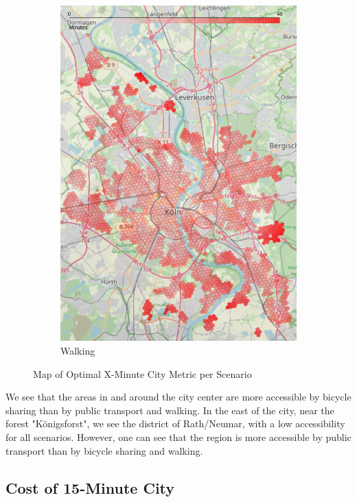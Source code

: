 \begin{figure}
\begin{subfigure}[b]{0.3\textwidth}
         \includegraphics[width=\textwidth]{Figures/results/minute_city_metric/walking_optimal_map}
         \caption{Walking}
         \label{fig:walking_optimal_map}
     \end{subfigure}
        \caption{Map of Optimal X-Minute City Metric per Scenario}
        \label{fig:optimal_map_per_scenario}
\end{figure}
We see that the areas in and around the city center are more accessible by bicycle sharing than by public transport and walking.
In the east of the city, near the forest "Königsforst", we see the district of Rath/Neumar, with a low accessibility for all scenarios.
However, one can see that the region is more accessible by public transport than by bicycle sharing and walking.

\subsection{Cost of 15-Minute City}
\label{subsec:cost_of_15_minute_city}

